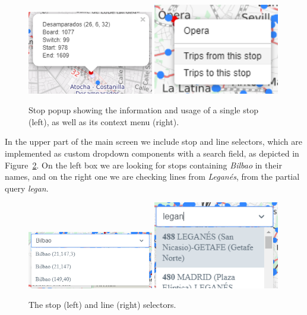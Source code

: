 	\begin{figure}[ht]
		\begin{center}
			{\includegraphics[width=0.49\textwidth]{screens/stop_fix.png}}
			{\includegraphics[width=0.49\textwidth]{screens/rclick_cut.png}}
		\end{center}
		\caption{Stop popup showing the information and usage of a single stop (left), as well as its context menu (right).}
		\label{fig:ui:stop}
	\end{figure}
	
	In the upper part of the main screen we include stop and line selectors, which are implemented as custom dropdown components with a search field, as depicted in Figure~\ref{fig:ui:select}.  On the left box we are looking for stops containing \textit{Bilbao} in their names, and on the right one we are checking lines from \textit{Legan\'es}, from the partial query \textit{legan}.
	
	\begin{figure}[ht]
		\begin{center}
			{\includegraphics[width=0.49\textwidth]{screens/stop-select_cut.png}}
			{\includegraphics[width=0.49\textwidth]{screens/lines-select_cut.png}}
		\end{center}
		\caption{The stop (left) and line (right) selectors.}
		\label{fig:ui:select}
	\end{figure}
	

